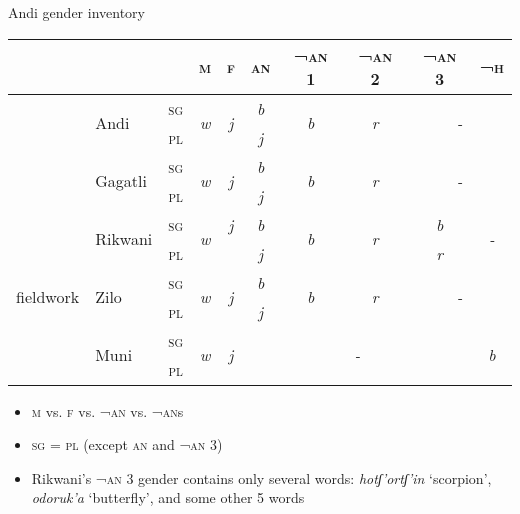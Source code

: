 \documentclass[13pt, t]{beamer}
\begin{document}
\begin{frame}{Andi gender inventory}
\small
\begin{tabular}{|l|l|c|c|c|c|c|c|c|c|}
\hline
\multicolumn{3}{|c|}{}  & \textsc{m} & \textsc{f} & \textsc{an} & \textsc{¬an} 1 & \textsc{¬an} 2 & \textsc{¬an} 3 & \textsc{¬h} \\ \hline
\multirow{2}{*}{\citep{alekseev99}} & \multirow{ 2}{*}{Andi} & \textsc{sg} & \multirow{2}{*}{\textit{w}} & \multirow{2}{*}{\textit{j}} & \textit{b} & \multirow{2}{*}{\textit{b}} & \multirow{2}{*}{\textit{r}} & \multicolumn{2}{|c|}{\multirow{2}{*}{\textit{-}}}  \\ \cline{3-3} \cline{6-6}
 &  & \textsc{pl} & \textit{} & \textit{} & \textit{j} & \textit{} & \textit{} & \multicolumn{2}{|c|}{} \\ \hline
\multirow{2}{*}{\citep{salimov10}} & \multirow{2}{*}{Gagatli} & \textsc{sg} & \multirow{2}{*}{\textit{w}} & \multirow{2}{*}{\textit{j}} & \textit{b} & \multirow{2}{*}{\textit{b}} & \multirow{2}{*}{\textit{r}} & \multicolumn{2}{|c|}{\multirow{2}{*}{\textit{-}}} \\ \cline{3-3} \cline{6-6}
 &  & \textsc{pl} & \textit{} & \textit{} & \textit{j} & \textit{} & \textit{} & \multicolumn{2}{|c|}{} \\ \hline
\multirow{2}{*}{\citep{suleymanov57}} & \multirow{2}{*}{Rikwani} & \textsc{sg} & \multirow{2}{*}{\textit{w}} & \textit{j} & \textit{b} & \multirow{2}{*}{\textit{b}} & \multirow{2}{*}{\textit{r}} & \textit{b} & \multirow{2}{*}{\textit{-}} \\ \cline{3-3} \cline{6-6} \cline{9-9}
 & & \textsc{pl} & \textit{} & \textit{} & \textit{j} & \textit{} & \textit{} & \textit{r} &  \\ \hline
\multirow{2}{*}{fieldwork} & \multirow{2}{*}{Zilo} & \textsc{sg} & \multirow{2}{*}{\textit{w}} & \multirow{2}{*}{\textit{j}} & \textit{b} & \multirow{2}{*}{\textit{b}} & \multirow{2}{*}{\textit{r}} & \multicolumn{2}{|c|}{\multirow{2}{*}{\textit{-}}}  \\ \cline{3-3} \cline{6-6}
 & & \textsc{pl} & \textit{} & \textit{} & \textit{j}& \textit{} & \textit{} & \multicolumn{2}{|c|}{}  \\ \hline
\multirow{2}{*}{\citep{suleymanov57}} & \multirow{2}{*}{Muni} & \textsc{sg} & \multirow{2}{*}{\textit{w}} & \multirow{2}{*}{\textit{j}} & \multicolumn{4}{|c|}{\multirow{2}{*}{\textit{-}}}  & \multirow{2}{*}{\textit{b}} \\ \cline{3-3}
 & & \textsc{pl} & \textit{} & \textit{} & \multicolumn{4}{|c|}{} &  \\ \hline
\end{tabular}
\normalsize
\begin{itemize}
\item \textsc{m} vs. \textsc{f} vs. \textsc{¬an} vs. \textsc{¬an}s 
\item \textsc{sg} = \textsc{pl} (except \textsc{an} and \textsc{¬an 3})
\item Rikwani's \textsc{¬an} 3 gender  contains only several words: \textit{hotʃ'ortʃ'in} `scorpion', \textit{odoruk'a} `butterfly', and some other 5 words


\end{itemize}
\end{frame}
\end{document}
